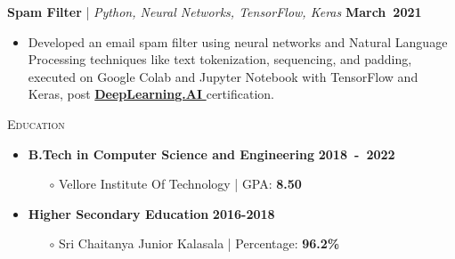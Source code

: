 \documentclass[11pt, a4paper]{article}
\newcommand{\dates}[1]{\hfill\mbox{\textbf{#1}}} %
\newcommand{\headright}[1]{\vspace*{1.5ex}\textsc{\Large\color{heading}#1}\par%
     \vspace*{-1.5ex}{\color{accent}\hrulefill}\par}
\begin{document}
\begin{minipage}[t]{0.66\textwidth}
\textbf{Spam Filter} \href{https://github.com/durgirajesh/Machine-Learning/tree/master/Email\%20Spam}{\textbf{\faGithub}} | \textit{Python, Neural Networks, TensorFlow, Keras}  \dates{March 2021}
\begin{itemize}
\item Developed an email spam filter using neural networks and Natural Language Processing techniques like text tokenization, sequencing, and padding, executed on Google Colab and Jupyter Notebook with TensorFlow and Keras, post \href{https://www.coursera.org/account/accomplishments/verify/XQ5LBXEPKP8H}{\textbf{DeepLearning.AI} } certification.
\end{itemize}



\headright{Education}
\begin{itemize}
  \item \textbf{B.Tech in Computer Science and Engineering} \dates{2018 - 2022}
    \begin{itemize}
      \item[$\circ$] Vellore Institute Of Technology | GPA: \textbf{8.50}
    \end{itemize}

  \item \textbf{Higher Secondary Education} \dates{2016-2018}
    \begin{itemize}
      \item[$\circ$] Sri Chaitanya Junior Kalasala | Percentage: \textbf{96.2\%}
    \end{itemize}
\end{itemize}

\end{minipage}
\end{document}
